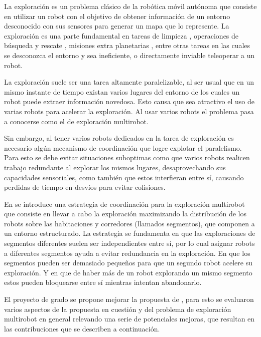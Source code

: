 La exploración es un problema clásico de la robótica móvil autónoma que
consiste en utilizar un robot con el objetivo de obtener información de un
entorno desconocido con sus sensores para generar un mapa que lo represente. La
exploración es una parte fundamental en tareas de limpieza \cite{luo2002real},
operaciones de búsqueda y rescate \cite{Liu2015}, misiones extra planetarias
\cite{schuster2019towards}, entre otras tareas en las cuales se desconozca el
entorno y sea ineficiente, o directamente inviable teleoperar a un robot.

La exploración suele ser una tarea altamente paralelizable, al ser usual que en
un mismo instante de tiempo existan varios lugares del entorno de los cuales un
robot puede extraer información novedosa. Esto causa que sea atractivo el uso
de varias robots para acelerar la exploración. Al usar varios robots el
problema pasa a conocerse como el de exploración multirobot.

Sin embargo, al tener varios robots dedicados en la tarea de exploración es
necesario algún mecanismo de coordinación que logre explotar el paralelismo.
Para esto se debe evitar situaciones suboptimas como que varios robots realicen
trabajo redundante al explorar los mismos lugares, desaprovechando sus
capacidades sensoriales, como también que estos interfieran entre sí, causando
perdidas de tiempo en desvíos para evitar colisiones.

En \cite{wurm2008coordinated} se introduce una estrategia de coordinación para la
exploración multirobot que consiste en llevar a cabo la exploración maximizando
la distribución de los robots sobre las habitaciones y corredores (llamados
segmentos), que componen a un entorno estructurado. La estrategia se fundamenta
en que las exploraciones de segmentos diferentes suelen ser independientes
entre sí, por lo cual asignar robots a diferentes segmentos ayuda a evitar
redundancia en la exploración. En que los segmentos pueden ser demasiado
pequeños para que un segundo robot acelere su exploración. Y en que de haber
más de un robot explorando un mismo segmento estos pueden bloquearse entre sí
mientras intentan abandonarlo.


El proyecto de grado se propone mejorar la propuesta de
\cite{wurm2008coordinated}, para esto se evaluaron varios aspectos de la
propuesta en cuestión y del problema de exploración multirobot en general
relevando una serie de potenciales mejoras, que resultan en las contribuciones
que se describen a continuación.


